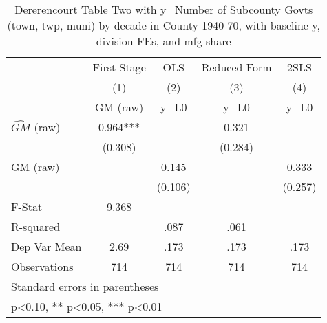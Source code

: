 \begin{table}[htbp]\centering
\def\sym#1{\ifmmode^{#1}\else\(^{#1}\)\fi}
\caption{Dererencourt Table Two with y=Number of Subcounty Govts (town, twp, muni) by decade in County 1940-70, with baseline y, division FEs, and mfg share}
\begin{tabular}{l*{4}{c}}
\toprule
                    & First Stage   &         OLS   &Reduced Form   &        2SLS   \\
                    &\multicolumn{1}{c}{(1)}&\multicolumn{1}{c}{(2)}&\multicolumn{1}{c}{(3)}&\multicolumn{1}{c}{(4)}\\
                    &\multicolumn{1}{c}{GM  (raw)}&\multicolumn{1}{c}{y\_L0}&\multicolumn{1}{c}{y\_L0}&\multicolumn{1}{c}{y\_L0}\\
\midrule
$\hat{GM}$ (raw)    &       0.964***&               &       0.321   &               \\
                    &     (0.308)   &               &     (0.284)   &               \\
\addlinespace
GM  (raw)           &               &       0.145   &               &       0.333   \\
                    &               &     (0.106)   &               &     (0.257)   \\
\midrule
F-Stat              &       9.368   &               &               &               \\
R-squared           &               &        .087   &        .061   &               \\
Dep Var Mean        &        2.69   &        .173   &        .173   &        .173   \\
Observations        &         714   &         714   &         714   &         714   \\
\bottomrule
\multicolumn{5}{l}{\footnotesize Standard errors in parentheses}\\
\multicolumn{5}{l}{\footnotesize * p<0.10, ** p<0.05, *** p<0.01}\\
\end{tabular}
\end{table}
